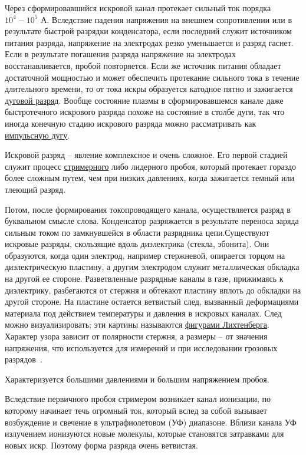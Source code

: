 \documentclass[10pt, a4paper]{article}
\begin{document}
Через сформировавшийся искровой канал протекает сильный ток порядка $10^4-10^5$ А. Вследствие падения напряжения на внешнем сопротивлении или в результате быстрой разрядки конденсатора, если последний служит источником питания разряда, напряжение на электродах резко уменьшается и разряд гаснет. Если в результате погашения разряда напряжение на электродах восстанавливается, пробой повторяется. Если же источник питания обладает достаточной мощностью и может обеспечить протекание сильного тока в течение длительного времени, то от тока искры образуется катодное пятно и зажигается \uline{дуговой разряд}. Вообще состояние плазмы в сформировавшемся канале даже быстротечного искрового разряда похоже на состояние в столбе дуги, так что иногда конечную стадию искрового разряда можно рассматривать как \uline{импульсную дугу}.

Искровой разряд -- явление комплексное и очень сложное. Его первой стадией служит процесс \uline{стримерного} либо лидерного пробоя, который протекает гораздо более сложным путем, чем при низких давлениях, когда зажигается темный или тлеющий разряд.

Потом, после формирования токопроводящего канала, осуществляется разряд в буквальном смысле слова. Конденсатор разряжается в результате переноса заряда сильным током по замкнувшейся в области разрядника цепи.Существуют искровые разряды, скользящие вдоль диэлектрика (стекла, эбонита). Они образуются, когда один электрод, например стержневой, опирается торцом на диэлектрическую пластину, а другим электродом служит металлическая обкладка на другой ее стороне. Разветвленные разрядные каналы в газе, прижимаясь к диэлектрику, разбегаются от стержня и обтекают пластину вплоть до обкладки на другой стороне. На пластине остается ветвистый след, вызванный деформациями материала под действием температуры и давления в искровых каналах. След можно визуализировать; эти картины называются \uline{фигурами Лихтенберга}. Характер узора зависит от полярности стержня, а размеры -- от значения напряжения, что используется для измерений и при исследовании грозовых разрядов~\cite{raizer}.

Характеризуется большими давлениями и большим напряжением пробоя.

Вследствие первичного пробоя стримером возникает канал ионизации, по которому начинает течь огромный ток, который вслед за собой вызывает возбуждение и свечение в ультрафиолетовом (УФ) диапазоне. Вблизи канала УФ излучением ионизуются новые молекулы, которые становятся затравками для новых искр. Поэтому форма разряда очень ветвистая.
\end{document}
